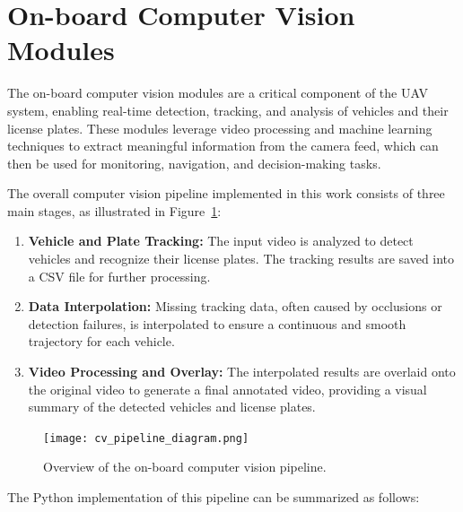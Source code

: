 
\section{On-board Computer Vision Modules}

The on-board computer vision modules are a critical component of the UAV system, enabling real-time detection, tracking, and analysis of vehicles and their license plates. These modules leverage video processing and machine learning techniques to extract meaningful information from the camera feed, which can then be used for monitoring, navigation, and decision-making tasks.

The overall computer vision pipeline implemented in this work consists of three main stages, as illustrated in Figure~\ref{fig:cv_pipeline}:

\begin{enumerate}
    \item \textbf{Vehicle and Plate Tracking:} The input video is analyzed to detect vehicles and recognize their license plates. The tracking results are saved into a CSV file for further processing.
    \item \textbf{Data Interpolation:} Missing tracking data, often caused by occlusions or detection failures, is interpolated to ensure a continuous and smooth trajectory for each vehicle.
    \item \textbf{Video Processing and Overlay:} The interpolated results are overlaid onto the original video to generate a final annotated video, providing a visual summary of the detected vehicles and license plates.
\end{enumerate}

\begin{figure}[h!]
    \centering
    \texttt{[image: cv\_pipeline\_diagram.png]} %
    \caption{Overview of the on-board computer vision pipeline.}
    \label{fig:cv_pipeline}
\end{figure}

The Python implementation of this pipeline can be summarized as follows:

